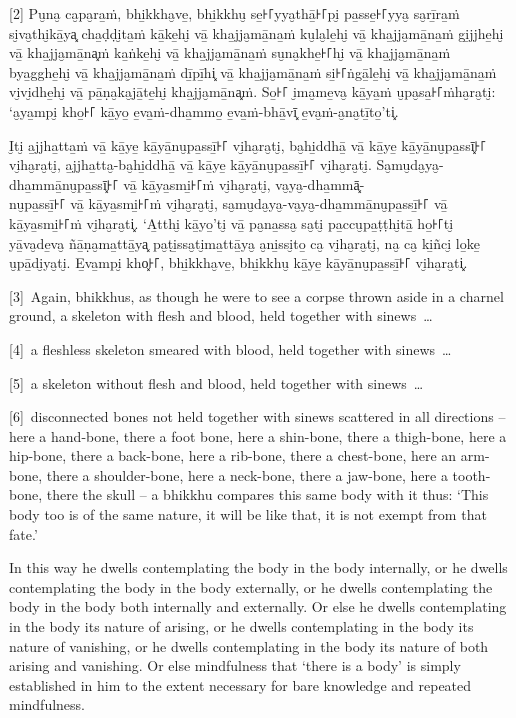 [2] Pu̮na̮ ca̮pa̮ra̱ṁ, bhi̱kkha̮ve̱, bhi̱kkhu̮ se̱꜔꜒yya̮thā̱꜔꜒pi̮ pa̱sse̱꜔꜒yya̮ sa̮rī̱ra̱ṁ si̮va̮thi̮kā̱ya͓
cha̱ḍḍi̮ta̱ṁ kā̱ke̱hi̮ vā̱ kha̱jja̮mā̱na̱ṁ ku̮la̮le̱hi̮ vā̱ kha̱jja̮mā̱na̱ṁ gi̱jjhe̱hi̮ vā̱ kha̱jja̮mā̱na͓ṁ
ka̱ṅke̱hi̮ vā̱ kha̱jja̮mā̱na̱ṁ su̮na̮khe̱꜔꜒hi̮ vā̱ kha̱jja̮mā̱na̱ṁ bya̱gghe̱hi̮ vā̱ kha̱jja̮mā̱na̱ṁ dī̱pī̱hi͓
vā̱ kha̱jja̮mā̱na̱ṁ si̱꜔꜒ṅgā̱le̱hi̮ vā̱ kha̱jja̮mā̱na̱ṁ vi̮vi̮dhe̱hi̮ vā̱ pā̱ṇa̮ka̮jā̱te̱hi̮ kha̱jja̮mā̱na͓ṁ.
So̱꜔꜒ i̮ma̮me̱va̮ kā̱ya̱ṁ u̮pa̮sa̱꜔꜒ṁha̮ra̮ti̮: ‘a̮ya̱mpi̮ kho̱꜔꜒ kā̱yo̱ e̱va̱ṁ-dha̱mmo̱ e̱va̱ṁ-bhā̱vī͓
e̱va̮ṁ-a̮na̮tī̱to̱’ti͓.

I̮ti̮ a̱jjha̱tta̱ṁ vā̱ kā̱ye̱ kā̱yā̱nu̮pa̱ssī̱꜔꜒ vi̮ha̮ra̮ti̮, ba̮hi̱ddhā̱ vā̱ kā̱ye̱ kā̱yā̱nu̮pa̱ssī͓꜔꜒
vi̮ha̮ra̮ti̮, a̱jjha̱tta̮-ba̮hi̱ddhā̱ vā̱ kā̱ye̱ kā̱yā̱nu̮pa̱ssī̱꜔꜒ vi̮ha̮ra̮ti̮. Sa̮mu̮da̮ya̮-dha̱mmā̱nu̮pa̱ssī͓꜔꜒
vā̱ kā̱ya̱smi̱꜔꜒ṁ vi̮ha̮ra̮ti̮, va̮ya̮-dha̱mmā͓-\\
nu̮pa̱ssī̱꜔꜒ vā̱ kā̱ya̱smi̱꜔꜒ṁ vi̮ha̮ra̮ti̮, sa̮mu̮da̮ya̮-va̮ya̮-dha̱mmā̱nu̮pa̱ssī̱꜔꜒ vā̱ kā̱ya̱smi̱꜔꜒ṁ vi̮ha̮ra̮ti͓.
‘A̱tthi̮ kā̱yo̱’ti̮ vā̱ pa̮na̱ssa̮ sa̮ti̮ pa̱ccu̮pa̱ṭṭhi̮tā̱ ho̱꜔꜒ti̮ yā̱va̮de̱va̮ ñā̱ṇa̮ma̱ttā̱ya͓
pa̮ṭi̱ssa̮ti̮ma̱ttā̱ya̮ a̮ni̱ssi̮to̱ ca̮ vi̮ha̮ra̮ti̮, na̮ ca̮ ki̱ñci̮ lo̱ke̱ u̮pā̱di̮ya̮ti̮. E̱va̱mpi̮ kho͓꜔꜒,
bhi̱kkha̮ve̱, bhi̱kkhu̮ kā̱ye̱ kā̱yā̱nu̮pa̱ssī̱꜔꜒ vi̮ha̮ra̮ti͓.

\englishPage

[3]~Again, bhikkhus, as though he were to see a corpse thrown aside in a
charnel ground, a skeleton with flesh and blood, held together with sinews~\ldots{}

[4]~a fleshless skeleton smeared with blood, held together with sinews~\ldots{}

[5]~a skeleton without flesh and blood, held together with sinews~\ldots{}

[6]~disconnected bones not held together with sinews scattered in all directions
-- here a hand-bone, there a foot bone, here a shin-bone, there a thigh-bone,
here a hip-bone, there a back-bone, here a rib-bone, there a chest-bone, here an
arm-bone, there a shoulder-bone, here a neck-bone, there a jaw-bone, here a
tooth-bone, there the skull -- a bhikkhu compares this same body with it thus:
`This body too is of the same nature, it will be like that, it is not exempt
from that fate.'

In this way he dwells contemplating the body in the body internally, or he
dwells contemplating the body in the body externally, or he dwells contemplating
the body in the body both internally and externally. Or else he dwells
contemplating in the body its nature of arising, or he dwells contemplating in
the body its nature of vanishing, or he dwells contemplating in the body its
nature of both arising and vanishing. Or else mindfulness that ‘there is a body’
is simply established in him to the extent necessary for bare knowledge and
repeated mindfulness.

